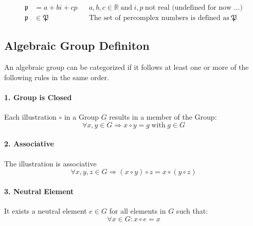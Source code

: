 \documentclass[a4paper,english,parskip]{scrartcl}
\begin{document}
\begin{tcolorbox}[title=Percomplex Numbers,colframe=blue!60, colback=blue!5]
\vspace{-20pt}
\begin{align*}
\mathfrak{p} &= a + bi + cp && a,b,c \in \mathbb{R} \hspace{3pt} \text{and} \hspace{3pt} i,p \hspace{3pt} \text{not real (undefined for now ...)} \\
\mathfrak{p} &\in \mathfrak{P} && \text{The set of percomplex numbers is defined as} \hspace{3pt} \mathfrak{P}
\end{align*}

\end{tcolorbox}

\subsection{Algebraic Group Definiton}

An algebraic group can be categorized if it follows at least one or more of the following rules
in the same order.

\vspace{-10pt}
\paragraph{1. Group is Closed}
Each illustration $\circ$ in a Group $G$ results in a member of the Group: \\
\begin{equation*}
	\forall x,y \in G \Rightarrow x \circ y = g \hspace{3pt} \text{with} \hspace{3pt} g \in G
\end{equation*}

\vspace{-10pt}
\paragraph{2. Associative} 
The illustration is associative \\
\begin{equation*}
\forall x,y, z \in G \Rightarrow (x \circ y) \circ z = x \circ (y \circ z)
\end{equation*}

\vspace{-10pt}
\paragraph{3. Neutral Element}
It exists a neutral element $e \in G$ for all elements in $G$ such that:
\begin{equation*}
\forall x \in G : x \circ e = x
\end{equation*}
\end{document}
